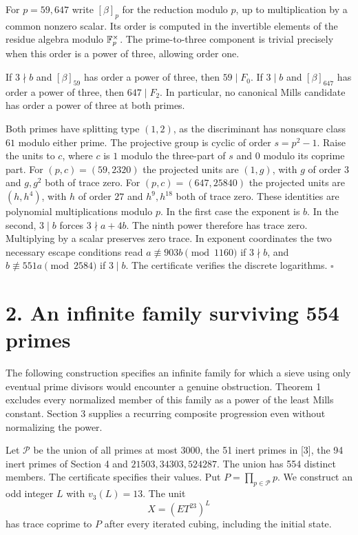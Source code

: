 \documentclass[11pt,a4paper,oneside,openany]{book}
\newcommand{\localhead}[1]{\needspace{5\baselineskip}\section*{\color{ink}#1}}
\let\sect\localhead\let\secx\localhead\let\head\localhead
\begin{document}
For $p=59,647$ write $[\beta]_p$ for the reduction modulo $p$, up to multiplication by a common nonzero scalar. Its order is computed in the invertible elements of the residue algebra modulo $\mathbb F_p^\times$. The prime-to-three component is trivial precisely when this order is a power of three, allowing order one.

 If $3\nmid b$ and $[\beta]_{59}$ has order a power of three, then $59\mid F_0$. If $3\mid b$ and $[\beta]_{647}$ has order a power of three, then $647\mid F_2$. In particular, no canonical Mills candidate has order a power of three at both primes.

 Both primes have splitting type $(1,2)$, as the discriminant has nonsquare class $61$ modulo either prime. The projective group is cyclic of order $s=p^2-1$. Raise the units to $c$, where $c$ is $1$ modulo the three-part of $s$ and $0$ modulo its coprime part. For $(p,c)=(59,2320)$ the projected units are $(1,g)$, with $g$ of order $3$ and $g,g^2$ both of trace zero. For $(p,c)=(647,25840)$ the projected units are $(h,h^4)$, with $h$ of order $27$ and $h^9,h^{18}$ both of trace zero. These identities are polynomial multiplications modulo $p$. In the first case the exponent is $b$. In the second, $3\mid b$ forces $3\nmid a+4b$. The ninth power therefore has trace zero. Multiplying by a scalar preserves zero trace. In exponent coordinates the two necessary escape conditions read $a\not\equiv903b\pmod{1160}$ if $3\nmid b$, and $b\not\equiv551a\pmod{2584}$ if $3\mid b$. The certificate verifies the discrete logarithms. \hfill$\square$


\sect{2. An infinite family surviving 554 primes}
The following construction specifies an infinite family for which a sieve using only eventual prime divisors would encounter a genuine obstruction. Theorem 1 excludes every normalized member of this family as a power of the least Mills constant. Section 3 supplies a recurring composite progression even without normalizing the power.

Let $\mathcal P$ be the union of all primes at most $3000$, the 51 inert primes in [3], the 94 inert primes of Section 4 and $21503,34303,524287$. The union has 554 distinct members. The certificate specifies their values. Put $P=\prod_{p\in\mathcal P}p$. We construct an odd integer $L$ with $v_3(L)=13$. The unit
\[
                 X=(ET^{23})^L
\]
has trace coprime to $P$ after every iterated cubing, including the initial state.
\end{document}
